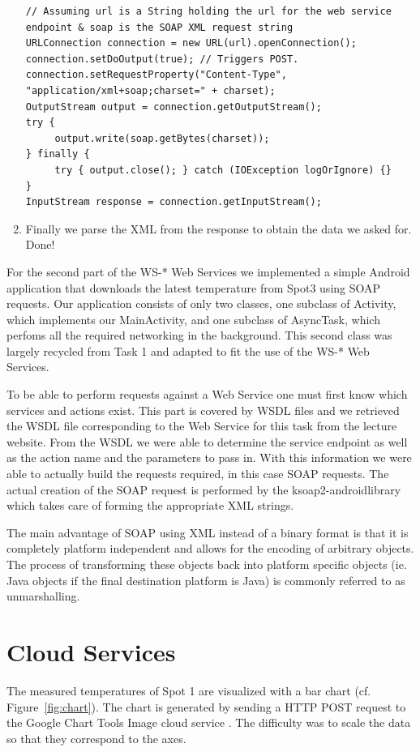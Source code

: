 \documentclass{report}
\newcommand{\rfig}[1]{Figure~\ref{fig:#1}}
\begin{document}
\begin{enumerate}
	\begin{lstlisting}
// Assuming url is a String holding the url for the web service endpoint & soap is the SOAP XML request string
URLConnection connection = new URL(url).openConnection();
connection.setDoOutput(true); // Triggers POST.
connection.setRequestProperty("Content-Type", "application/xml+soap;charset=" + charset);
OutputStream output = connection.getOutputStream();
try {
     output.write(soap.getBytes(charset));
} finally {
     try { output.close(); } catch (IOException logOrIgnore) {}
}
InputStream response = connection.getInputStream();
	\end{lstlisting}
	\item Finally we parse the XML from the response to obtain the data we asked for. Done!
\end{enumerate}


For the second part of the WS\hbox{-}* Web Services we implemented a simple Android application that downloads the latest temperature from Spot3 using SOAP requests. Our application consists of only two classes, one subclass of Activity, which implements our MainActivity, and one subclass of AsyncTask, which perfoms all the required networking in the background. This second class was largely recycled from Task 1 and adapted to fit the use of the WS\hbox{-}* Web Services.

To be able to perform requests against a Web Service one must first know which services and actions exist. This part is covered by WSDL files and we retrieved the WSDL file corresponding to the Web Service for this task from the lecture website. From the WSDL we were able to determine the service endpoint as well as the action name and the parameters to pass in. With this information we were able to actually build the requests required, in this case SOAP requests. The actual creation of the SOAP request is performed by the ksoap2-androidlibrary\cite{ksoap2} which takes care of forming the appropriate XML strings.

The main advantage of SOAP using XML instead of a binary format is that it is completely platform independent and allows for the encoding of arbitrary objects. The process of transforming these objects back into platform specific objects (ie. Java objects if the final destination platform is Java) is commonly referred to as unmarshalling.

\section{Cloud Services}
The measured temperatures of Spot 1 are visualized with a bar chart (cf. \rfig{chart}). The chart is generated by sending a HTTP POST request to the Google Chart Tools Image cloud service \cite{googleChart}. The difficulty was to scale the data so that they correspond to the axes.
\end{document}
